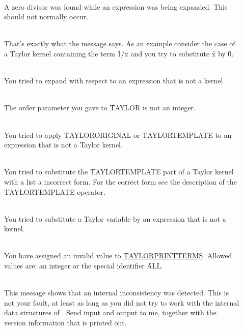 \begin{description}
\item[]\mbox{}\\
    A zero divisor was found while an expression was being expanded.
    This should not normally occur.

\item[]\mbox{}\\
    That's exactly what the message says.  As an example consider the
    case of a Taylor kernel containing the term \f{1/x} and you try
    to substitute \f{x} by \f{0}.

\item[]\mbox{}\\
    You tried to expand with respect to an expression that is not a
    kernel.

\item[]\mbox{}\\
    The order parameter you gave to \f{TAYLOR} is not an integer.

\item[]\mbox{}\\
 
    You tried to apply \f{TAYLORORIGINAL} or \f{TAYLORTEMPLATE}
    to an expression that is not a Taylor kernel.

\item[]\mbox{}\\
    You tried to substitute the \f{TAYLORTEMPLATE} part of a Taylor
    kernel with a list a incorrect form. For the correct form see the
    description of the \f{TAYLORTEMPLATE} operator.

\item[]\mbox{}\\
    You tried to substitute a Taylor variable by an expression that is
    not a kernel.

\item[]\mbox{}\\
    You have assigned an invalid value to \hyperlink{reserved:TAYLORPRINTTERMS}{\f{TAYLORPRINTTERMS}}.
    Allowed values are: an integer or the special identifier
    \f{ALL}.

\item[]\mbox{}\\
    This message shows that an internal inconsistency was detected.
    This is not your fault, at least as long as you did not try to
    work with the internal data structures of \REDUCE. Send input
    and output to me, together with the version information that is
    printed out.

\end{description}

